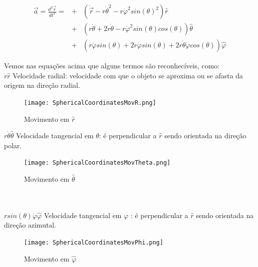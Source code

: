 \documentclass[a4paper,12pt, aps, rmp,twocolumn]{article}
\begin{document}
	\begin{eqnarray*}
	\vec{a} = \frac{ d^2 \vec{r} }{ dt^2 } = &+&( \ddot{\vec{r}}  - r \dot{\theta}^2 -r\dot{\varphi}^2 sin(\theta)^2 )\hat{r} \\ 
	&+&( r \ddot{\theta} + 2 \dot{r} \dot{\theta} -r\dot{\varphi}^2 sin(\theta) cos(\theta) )\hat{\theta} \\
	 &+& ( r \ddot{\varphi} sin(\theta) + 2\dot{r} \dot{\varphi} sin(\theta) + 2r\dot{\theta} \dot{\varphi} cos(\theta) ) \hat{\varphi} 
	\end{eqnarray*}
	
	 Vemos nas equações acima que alguns termos são reconhecíveis, como: \\
	 
 	$\dot{r}\hat{r}$  \indent  Velocidade radial: velocidade com que o objeto se aproxima ou se afasta da origem na direção radial.
 \begin{figure}[h]
		\begin{center}
			\texttt{[image: SphericalCoordinatesMovR.png]} 
			\caption{Movimento em $\hat{r}$}
		\end{center}
	\end{figure}
	
 $ r \dot{\theta}\hat{\theta}$ \indent Velocidade tangencial em $\theta$: é perpendicular a $\hat{r}$ sendo orientada na direção polar.
	\begin{figure}[h]
		\begin{center}
			\texttt{[image: SphericalCoordinatesMovTheta.png]} 
			\caption{Movimento em $\hat{\theta}$}
		\end{center}
	\end{figure}
	\\ \\
	$rsin(\theta)\dot{\varphi}\hat{\varphi}$ \indent Velocidade tangencial em $\varphi$ : é perpendicular a $\hat{r}$ sendo orientada na direção azimutal.
	\begin{figure}[h]
		\begin{center}
			\texttt{[image: SphericalCoordinatesMovPhi.png]} 
			\caption{Movimento em $\hat{\varphi}$}
		\end{center}
	\end{figure}
\end{document}
